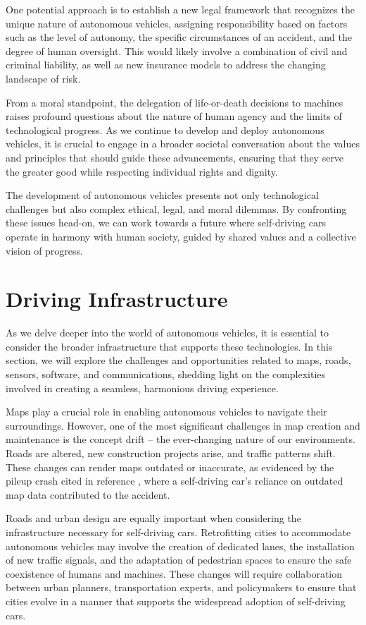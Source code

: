 One potential approach is to establish a new legal framework that recognizes the unique nature of autonomous vehicles, assigning responsibility based on factors such as the level of autonomy, the specific circumstances of an accident, and the degree of human oversight. This would likely involve a combination of civil and criminal liability, as well as new insurance models to address the changing landscape of risk.

From a moral standpoint, the delegation of life-or-death decisions to machines raises profound questions about the nature of human agency and the limits of technological progress. As we continue to develop and deploy autonomous vehicles, it is crucial to engage in a broader societal conversation about the values and principles that should guide these advancements, ensuring that they serve the greater good while respecting individual rights and dignity.

The development of autonomous vehicles presents not only technological challenges but also complex ethical, legal, and moral dilemmas. By confronting these issues head-on, we can work towards a future where self-driving cars operate in harmony with human society, guided by shared values and a collective vision of progress.

\section{Driving Infrastructure}

As we delve deeper into the world of autonomous vehicles, it is essential to consider the broader infrastructure that supports these technologies. In this section, we will explore the challenges and opportunities related to maps, roads, sensors, software, and communications, shedding light on the complexities involved in creating a seamless, harmonious driving experience.

Maps play a crucial role in enabling autonomous vehicles to navigate their surroundings. However, one of the most significant challenges in map creation and maintenance is the concept drift – the ever-changing nature of our environments. Roads are altered, new construction projects arise, and traffic patterns shift. These changes can render maps outdated or inaccurate, as evidenced by the pileup crash cited in reference \cite{pileupcrash}, where a self-driving car's reliance on outdated map data contributed to the accident.

Roads and urban design are equally important when considering the infrastructure necessary for self-driving cars. Retrofitting cities to accommodate autonomous vehicles may involve the creation of dedicated lanes, the installation of new traffic signals, and the adaptation of pedestrian spaces to ensure the safe coexistence of humans and machines. These changes will require collaboration between urban planners, transportation experts, and policymakers to ensure that cities evolve in a manner that supports the widespread adoption of self-driving cars.

